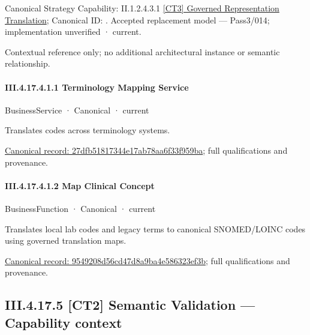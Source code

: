 {\small Canonical Strategy Capability: II.1.2.4.3.1 \hyperref[element:bfaeedaf94c54505bc0616e4653b5767]{[CT3] Governed Representation Translation}; Canonical ID: \texttt{}. Accepted replacement model — Pass3/014; implementation unverified · current.}\par
Contextual reference only; no additional architectural instance or semantic relationship.\par
\paragraph*{III.4.17.4.1.1 Terminology Mapping Service}
\label{navigation:III.4.17.4.1.1}

\label{element:27dfb51817344e17ab78aa6f33f959ba}
{\small BusinessService · Canonical · current}\par

Translates codes across terminology systems.


{\footnotesize \href{../../../../../../../../continuum/business/business-service/27dfb51817344e17ab78aa6f33f959ba.md}{Canonical record: 27dfb51817344e17ab78aa6f33f959ba}; full qualifications and provenance.}\par
\paragraph*{III.4.17.4.1.2 Map Clinical Concept}
\label{navigation:III.4.17.4.1.2}

\label{element:9549208d56cd47d8a9ba4e586323ef3b}
{\small BusinessFunction · Canonical · current}\par

Translates local lab codes and legacy terms to canonical SNOMED/LOINC codes using governed translation maps.


{\footnotesize \href{../../../../../../../../continuum/business/business-function/9549208d56cd47d8a9ba4e586323ef3b.md}{Canonical record: 9549208d56cd47d8a9ba4e586323ef3b}; full qualifications and provenance.}\par
\subsection*{III.4.17.5 [CT2] Semantic Validation — Capability context}
\label{navigation:III.4.17.5}

